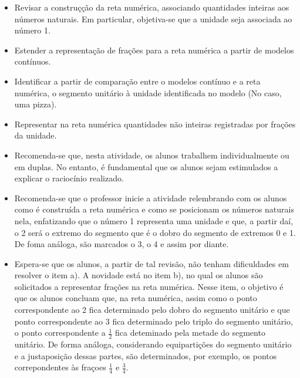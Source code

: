\documentclass[oneside]{book}
\begin{document}
\begin{multicols}{2}
\begin{itemize} %
    \item       Revisar a construçção da reta numérica, associando quantidades inteiras aos números naturais. Em particular, objetiva-se que a unidade seja associada ao número 1.
    \item       Estender a representação de frações para a reta numérica a partir de modelos contínuos. 
    \item       Identificar a partir de comparação entre o modelos contínuo e a reta numérica, o segmento unitário à unidade identificada no modelo (No caso, uma pizza).
    \item       Representar na reta numérica quantidades não inteiras registradas por frações da unidade. 
\end{itemize} %
      
     
\begin{itemize} %
    \item        Recomenda-se que, nesta atividade, os alunos trabalhem individualmente ou em duplas. No entanto, é fundamental que os alunos sejam estimulados a explicar o raciocínio realizado.
    \item        Recomenda-se que o professor inicie a atividade relembrando com os alunos como é construída a reta numérica e como se posicionam os números naturais nela, enfatizando que o número 1 representa uma unidade e que, a partir daí, o 2 será o extremo do segmento que é o dobro do segmento de extremos 0 e 1. De foma análoga, são marcados o 3, o 4 e assim por diante.
    \item       Espera-se que os alunos, a partir de tal revisão, não tenham dificuldades em resolver o item a). A novidade está no item b), no qual os alunos são solicitados a representar frações na reta numérica. Nesse item, o objetivo é que os alunos concluam que, na reta numérica, assim como o ponto correspondente ao 2 fica determinado pelo dobro do segmento unitário e que ponto correspondente ao 3 fica determinado pelo triplo do segmento unitário, o ponto correspondente a       $\frac{1}{2}$       fica deteminado pela metade do segmento unitário. De forma análoga, considerando equipartições do segmento unitário e a justaposição dessas partes, são determinados, por exemplo, os pontos correpondentes às fraçoes       $\frac{1}{4}$       e       $\frac{3}{4}$.
\end{itemize} %


\end{multicols}
\end{document}
